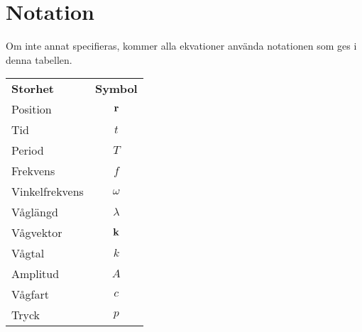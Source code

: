 \section{Notation}
Om inte annat specifieras, kommer alla ekvationer använda notationen som ges i denna tabellen.

\begin{table}[!h]
	\centering
	\begin{tabular}{| l | c |}
		\hline
		\textbf{Storhet} & \multicolumn{1}{|l|}{\textbf{Symbol}}\\
		Position         & $\vect{r}$ \\
		\hline
		Tid              & $t$ \\
		\hline
		Period           & $T$ \\
		\hline
		Frekvens         & $f$ \\
		\hline
		Vinkelfrekvens   & $\omega$ \\
		\hline
		Våglängd         & $\lambda$ \\
		\hline
		Vågvektor        & $\vect{k}$ \\
		\hline
		Vågtal           & $k$ \\
		\hline
		Amplitud         & $A$ \\
		\hline
		Vågfart          & $c$ \\
		\hline
		Tryck            & $p$ \\
		\hline
	\end{tabular}
\end{table}